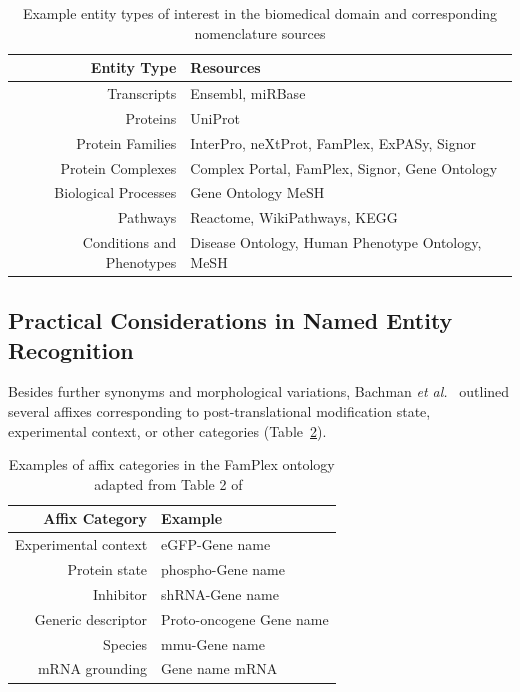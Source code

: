 \begin{table}
    \centering
    \begin{tabular}{ r l }
        Entity Type & Resources \\
        \hline
        Transcripts & Ensembl, miRBase \\
        Proteins & UniProt \\
        Protein Families & InterPro, neXtProt, FamPlex, ExPASy, Signor \\
        Protein Complexes & Complex Portal, FamPlex, Signor, Gene Ontology \\
        Biological Processes & Gene Ontology MeSH \\
        Pathways & Reactome, WikiPathways, KEGG \\
        Conditions and Phenotypes & Disease Ontology, Human Phenotype Ontology, MeSH
    \end{tabular}
    \caption{Example entity types of interest in the biomedical domain and corresponding nomenclature sources}
    \label{tab:other_nomenclature_databases}
\end{table}

\subsection{Practical Considerations in Named Entity Recognition}

Besides further synonyms and morphological variations, Bachman \textit{et al.}~\cite{Bachman2018} outlined several affixes corresponding to post-translational modification state, experimental context, or other categories (Table~\ref{tab:affix_categories}).

\begin{table}
    \centering
    \begin{tabular}{ r l }
        Affix Category & Example \\
        \hline
        Experimental context & eGFP-{Gene name} \\
        Protein state & phospho-{Gene name} \\
        Inhibitor & shRNA-{Gene name} \\
        Generic descriptor & Proto-oncogene {Gene name} \\
        Species & mmu-{Gene name} \\
        mRNA grounding & {Gene name} mRNA
    \end{tabular}
    \caption{Examples of affix categories in the FamPlex ontology adapted from Table 2 of~\cite{Bachman2018}}
    \label{tab:affix_categories}
\end{table}

